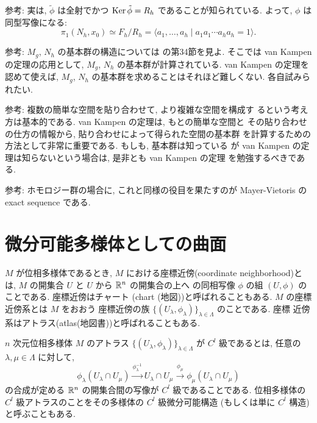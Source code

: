 \documentclass[12pt,twoside]{jarticle}
\def\R{{\Bbb R}} %
\def\Ker{\mathop{\text{\rm Ker}}\nolimits}   %
\begin{document}
\noindent 参考: 実は, $\tilde\phi$ は全射でかつ $\Ker\tilde\phi = R_h$ %
であることが知られている. よって, $\phi$ は同型写像になる:
\[
  \pi_1(N_h,x_0)
  \simeq
  F_h/R_h
  =
  \langle
    a_1, \dots, a_h
  \mid
    a_1 a_1 \cdots a_h a_h = 1
  \rangle.
\]

\smallskip

\noindent 参考: $M_g$, $N_h$ の基本群の構造については \cite{Tamura}{} 
の第34節を見よ. そこでは van Kampen の定理の応用として, $M_g$, $N_h$ 
の基本群が計算されている. van Kampen の定理を認めて使えば, $M_g$,
$N_h$ の基本群を求めることはそれほど難しくない. 各自試みられたい.

\smallskip

\noindent 参考: 複数の簡単な空間を貼り合わせて, より複雑な空間を構成す
るという考え方は基本的である. van Kampen の定理は, もとの簡単な空間と
その貼り合わせの仕方の情報から, 貼り合わせによって得られた空間の基本群
を計算するための方法として非常に重要である. もしも, 基本群は知っている
が van Kampen の定理は知らないという場合は, 是非とも van Kampen の定理
を勉強するべきである.

\smallskip

\noindent 参考: ホモロジー群の場合に, これと同様の役目を果たすのが 
Mayer-Vietoris の exact sequence である.


\section{微分可能多様体としての曲面}

$M$ が位相多様体であるとき, $M$ における座標近傍(coordinate
neighborhood)とは, $M$ の開集合 $U$ と $U$ から $\R^n$ の開集合の上へ
の同相写像 $\phi$ の組 $(U, \phi)$ のことである. 座標近傍はチャート
(chart (地図))と呼ばれることもある. $M$ の座標近傍系とは $M$ をおおう
座標近傍の族 %
$\{(U_\lambda,\phi_\lambda)\}_{\lambda\in\Lambda}$ のことである. 座標
近傍系はアトラス(atlas(地図書))と呼ばれることもある. 

$n$ 次元位相多様体 $M$ のアトラス %
$\{(U_\lambda,\phi_\lambda)\}_{\lambda\in\Lambda}$ %
が $C^l$ 級であるとは, 任意の $\lambda, \mu \in \Lambda$ に対して, 
\[
  \phi_\lambda(U_\lambda\cap U_\mu)
  \overset{\phi_\lambda^{-1}}\longrightarrow
  U_\lambda\cap U_\mu
  \overset{\phi_\mu}\longrightarrow
  \phi_\mu(U_\lambda\cap U_\mu)
\] %
の合成が定める $\R^n$ の開集合間の写像が $C^l$ 級であることである.  %
位相多様体の $C^l$ 級アトラスのことをその多様体の $C^l$ 級微分可能構造
(もしくは単に $C^l$ 構造)と呼ぶこともある.
\end{document}
